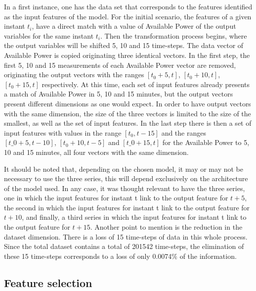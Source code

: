 In a first instance, one has the data set that corresponds to the features identified as the input features of the model. For the initial scenario, the features of a given instant $t_i$, have a direct match with a value of Available Power of the output variables for the same instant $t_i$.  Then the transformation process begins, where the output variables will be shifted 5, 10 and 15 time-steps. The data vector of Available Power is copied originating three identical vectors. In the first step, the first 5, 10 and 15 measurements of each Available Power vector are removed, originating the output vectors with the ranges $[t_0 + 5, t]$, $[t_0 + 10, t]$, $[t_0 + 15, t]$ respectively. At this time, each set of input features already presents a match of Available Power in 5, 10 and 15 minutes, but the output vectors present different dimensions as one would expect. In order to have output vectors with the same dimension, the size of the three vectors is limited to the size of the smallest, as well as the set of input features. In the last step there is then a set of input features with values in the range $[t_0, t-15]$ and the ranges $[t\_0 + 5, t-10]$, $[t_0 + 10, t-5]$ and $[t\_0 + 15, t]$ for the Available Power to 5, 10 and 15 minutes, all four vectors with the same dimension. 

It should be noted that, depending on the chosen model, it may or may not be necessary to use the three series, this will depend exclusively on the architecture of the model used. In any case, it was thought relevant to have the three series, one in which the input features for instant t link to the output feature for $t+5$, the second in which the input features for instant t link to the output feature for $t+10$, and finally, a third series in which the input features for instant t link to the output feature for $t+15$. Another point to mention is the reduction in the dataset dimension. There is a loss of 15 time-steps of data in this whole process. Since the total dataset contains a total of 201542 time-steps, the elimination of these 15 time-steps corresponds to a loss of only 0.0074$\%$ of the information.

\subsection{Feature selection}\label{chap3:subsec:feature_selection}

